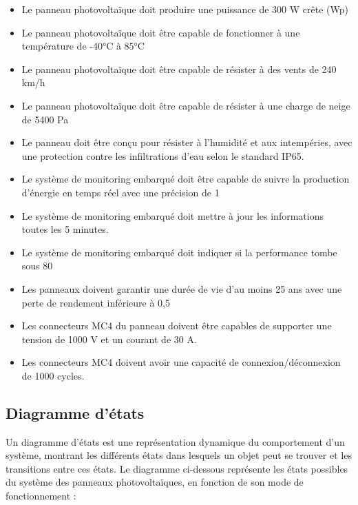 \documentclass{article}
\begin{document}
\begin{itemize}
    \item Le panneau photovoltaïque doit produire une puissance de 300 W crête (Wp)
    \item Le panneau photovoltaïque doit être capable de fonctionner à une température de -40°C à 85°C
    \item Le panneau photovoltaïque doit être capable de résister à des vents de 240 km/h
    \item Le panneau photovoltaïque doit être capable de résister à une charge de neige de 5400 Pa
    \item Le panneau doit être conçu pour résister à l’humidité et aux intempéries, avec une protection contre les infiltrations d’eau selon le standard IP65.
    \item Le système de monitoring embarqué doit être capable de suivre la production d'énergie en temps réel avec une précision de 1%
    \item Le système de monitoring embarqué doit mettre à jour les informations toutes les 5 minutes.
    \item Le système de monitoring embarqué doit indiquer si la performance tombe sous 80%
    \item Les panneaux doivent garantir une durée de vie d’au moins 25 ans avec une perte de rendement inférieure à 0,5 %
    \item Les connecteurs MC4 du panneau doivent être capables de supporter une tension de 1000 V et un courant de 30 A.
    \item Les connecteurs MC4 doivent avoir une capacité de connexion/déconnexion de 1000 cycles.
\end{itemize}

\clearpage

\subsection{Diagramme d'états}
Un diagramme d'états est une représentation dynamique du comportement d'un système, montrant les différents états dans lesquels un objet peut se trouver et les transitions entre ces états. Le diagramme ci-dessous représente les états possibles du système des panneaux photovoltaïques, en fonction de son mode de fonctionnement : 
\end{document}

